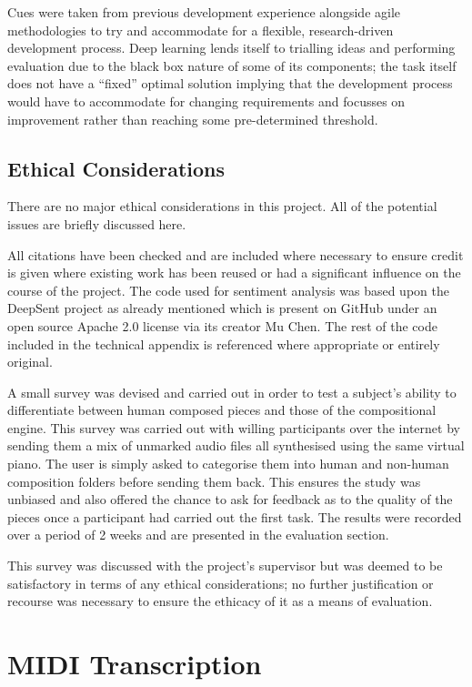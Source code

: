 \documentclass[12pt,]{article}
\begin{document}
Cues were taken from previous development experience alongside agile
methodologies to try and accommodate for a flexible, research-driven
development process. Deep learning lends itself to trialling ideas and
performing evaluation due to the black box nature of some of its
components; the task itself does not have a ``fixed'' optimal solution
implying that the development process would have to accommodate for
changing requirements and focusses on improvement rather than reaching
some pre-determined threshold.

\hypertarget{ethical-considerations}{%
\subsection{Ethical Considerations}\label{ethical-considerations}}

There are no major ethical considerations in this project. All of the
potential issues are briefly discussed here.

All citations have been checked and are included where necessary to
ensure credit is given where existing work has been reused or had a
significant influence on the course of the project. The code used for
sentiment analysis was based upon the DeepSent project as already
mentioned which is present on GitHub under an open source Apache 2.0
license via its creator Mu Chen. The rest of the code included in the
technical appendix is referenced where appropriate or entirely original.

A small survey was devised and carried out in order to test a subject's
ability to differentiate between human composed pieces and those of the
compositional engine. This survey was carried out with willing
participants over the internet by sending them a mix of unmarked audio
files all synthesised using the same virtual piano. The user is simply
asked to categorise them into human and non-human composition folders
before sending them back. This ensures the study was unbiased and also
offered the chance to ask for feedback as to the quality of the pieces
once a participant had carried out the first task. The results were
recorded over a period of 2 weeks and are presented in the evaluation
section.

This survey was discussed with the project's supervisor but was deemed
to be satisfactory in terms of any ethical considerations; no further
justification or recourse was necessary to ensure the ethicacy of it as
a means of evaluation.

\hypertarget{midi-transcription}{%
\section{MIDI Transcription}\label{midi-transcription}}
\end{document}
